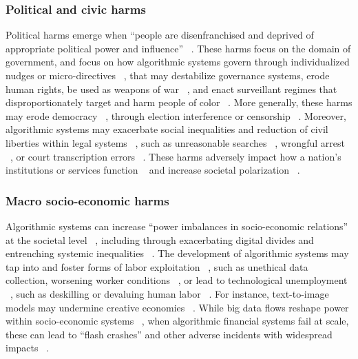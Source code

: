 \subsubsection{Political and civic harms} Political harms emerge when “people are disenfranchised and deprived of appropriate political power and influence” ~\cite[p. 162]{Sadowski_Selinger_2014}. These harms focus on the domain of government, and focus on how algorithmic systems govern through individualized nudges or micro-directives ~\cite{Satra_2020}, that may destabilize governance systems, erode human rights, be used as weapons of war ~\cite{Satra_2021}, and enact surveillant regimes that disproportionately target and harm people of color ~\cite{Katell_Young_Dailey_Herman_Guetler_Tam_Bintz_Raz_Krafft_2020}. More generally, these harms may erode democracy ~\cite{Green_Viljoen_2020}, through election interference or censorship ~\cite{Smuha_2021b}. Moreover, algorithmic systems may exacerbate social inequalities and reduction of civil liberties within legal systems ~\cite{Mannes_2020, Redden_Brand_2017}, such as unreasonable searches ~\cite{Moss_2021}, wrongful arrest ~\cite{Costanza-Chock_Raji_Buolamwini_2022, Costanza-Chock_Raji_Buolamwini_2022, koenecke2020racial}, or court transcription errors ~\cite{koenecke2020racial}. These harms adversely impact how a nation's institutions or services function ~\cite{Agrafiotis_Nurse_Goldsmith_Creese_Upton_2018} and increase societal polarization ~\cite{Smuha_2021b}.

\subsubsection{Macro socio-economic harms} Algorithmic systems can increase “power imbalances in socio-economic relations” at the societal level ~\cite[p. 182]{Agrafiotis_2016, Malik_Viljanen_Lepinkainen_Alvesalo-Kuusi_Others}, including through exacerbating digital divides and entrenching systemic inequalities ~\cite{Irani_Vertesi_Dourish_Philip_Grinter_2010, Wang_Zhao_Van_Kleek_Shadbolt_2022}. The development of algorithmic systems may tap into and foster forms of labor exploitation ~\cite{Docherty_Biega_2022, Mohamed_Png_Isaac_2020}, such as unethical data collection, worsening worker conditions ~\cite{Bengio_Beygelzimer_Crawford_Fromer_Gabriel_Levendowski_Raji_Ranzato_2022}, or lead to technological unemployment ~\cite{cave2019bridging}, such as deskilling or devaluing human labor ~\cite{Png_2022}. For instance, text-to-image models may undermine creative economies ~\cite{Weidinger2022}. While big data flows reshape power within socio-economic systems ~\cite{Mohamed_Png_Isaac_2020, Sambasivan_Arnesen_Hutchinson_Doshi_Prabhakaran_2021}, when algorithmic financial systems fail at scale, these can lead to “flash crashes” and other adverse incidents with widespread impacts ~\cite{Malik_Viljanen_Lepinkainen_Alvesalo-Kuusi_Others}.

